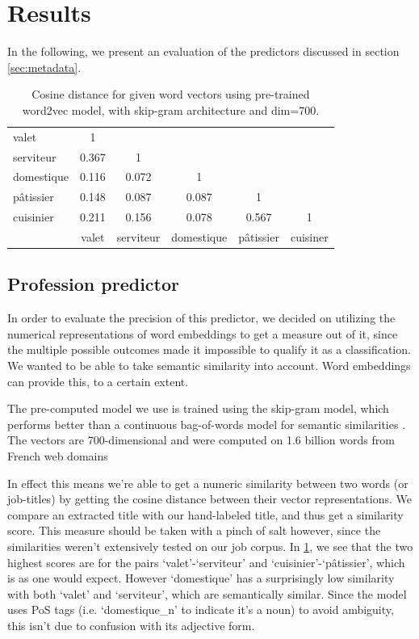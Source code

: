 \section{Results}
In the following, we present an evaluation of the predictors discussed in section \cref{sec:metadata}. 

\begin{table}
\centering
\begin{tabular}{| l | *{5}{c|}}
																				\cline{1-2}
valet		& 1																\\	\cline{1-3}
serviteur	& 0.367	& 1 													\\	\cline{1-4}
domestique	& 0.116	& 0.072 	& 1											\\	\cline{1-5}
p\^atissier	& 0.148	& 0.087		& 0.087			& 1							\\ 	\cline{1-6}
cuisinier 	& 0.211	& 0.156 	& 0.078			& 0.567			& 1			\\	\hline
 			& valet &serviteur	& domestique	&p\^atissier	& cuisiner	\\	\hline
\end{tabular}
\caption{Cosine distance for given word vectors using pre-trained word2vec model, with skip-gram architecture and dim=700.}
\label{tab:word_sim}
\end{table}

\subsection{Profession predictor}
In order to evaluate the precision of this predictor, we decided on utilizing the numerical representations of word embeddings to get a measure out of it, since the multiple possible outcomes made it impossible to qualify it as a classification. We wanted to be able to take semantic similarity into account. Word embeddings can provide this, to a certain extent. 

The pre-computed model we use is trained using the skip-gram model, which performs better than a continuous bag-of-words model for semantic similarities \cite{mikolov2013efficient}. The vectors are 700-dimensional and were computed on 1.6 billion words from French web domains

In effect this means we're able to get a numeric similarity between two words (or job-titles) by getting the cosine distance between their vector representations. We compare an extracted title with our hand-labeled title, and thus get a similarity score. This measure should be taken with a pinch of salt however, since the similarities weren't extensively tested on our job corpus. In \cref{tab:word_sim}, we see that the two highest scores are for the pairs `valet'-`serviteur' and `cuisinier'-`p\^atissier', which is as one would expect. However `domestique' has a surprisingly low similarity with both `valet' and `serviteur', which are semantically similar. Since the model uses PoS tags (i.e. `domestique\_n' to indicate it's a noun) to avoid ambiguity, this isn't due to confusion with its adjective form.

